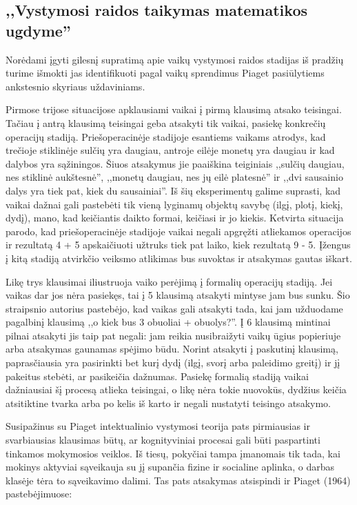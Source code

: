 \documentclass{article}
\begin{document}
\subsection{,,Vystymosi raidos taikymas matematikos ugdyme''}

Norėdami įgyti gilesnį supratimą apie vaikų vystymosi raidos stadijas iš pradžių turime išmokti jas identifikuoti pagal vaikų sprendimus Piaget pasiūlytiems ankstesnio skyriaus uždaviniams.

Pirmose trijose situacijose apklausiami vaikai į pirmą klausimą atsako teisingai. Tačiau į antrą klausimą teisingai geba atsakyti tik vaikai, pasiekę konkrečių operacijų stadiją. Priešoperacinėje stadijoje esantiems vaikams atrodys, kad trečioje stiklinėje sulčių yra daugiau, antroje eilėje monetų yra daugiau ir kad dalybos yra sąžiningos. Šiuos atsakymus jie paaiškina teiginiais ,,sulčių daugiau, nes stiklinė aukštesnė'', ,,monetų daugiau, nes jų eilė platesnė'' ir ,,dvi sausainio dalys yra tiek pat, kiek du sausainiai''. Iš šių eksperimentų galime suprasti, kad vaikai dažnai gali pastebėti tik vieną lyginamų objektų savybę (ilgį, plotį, kiekį, dydį), mano, kad keičiantis daikto formai, keičiasi ir jo kiekis. Ketvirta situacija parodo, kad priešoperacinėje stadijoje vaikai negali apgręžti atliekamos operacijos ir rezultatą 4 + 5 apskaičiuoti užtruks tiek pat laiko, kiek rezultatą 9 - 5. Įžengus į kitą stadiją atvirkčio veiksmo atlikimas bus suvoktas ir atsakymas gautas iškart.

Likę trys klausimai iliustruoja vaiko perėjimą į formalių operacijų stadiją. Jei vaikas dar jos nėra pasiekęs, tai į 5 klausimą atsakyti mintyse jam bus sunku. Šio straipsnio autorius pastebėjo, kad vaikas gali atsakyti tada, kai jam užduodame pagalbinį klausimą ,,o kiek bus 3 obuoliai + obuolys?''. Į 6 klausimą mintinai pilnai atsakyti jis taip pat negali: jam reikia nusibraižyti vaikų ūgius popieriuje arba atsakymas gaunamas spėjimo būdu. Norint atsakyti į paskutinį klausimą, paprasčiausia yra pasirinkti bet kurį dydį (ilgį, svorį arba paleidimo greitį) ir jį pakeitus stebėti, ar pasikeičia dažnumas. Pasiekę formalią stadiją vaikai dažniausiai šį procesą atlieka teisingai, o likę nėra tokie nuovokūs, dydžius keičia atsitiktine tvarka arba po kelis iš karto ir negali nustatyti teisingo atsakymo. \newline

Susipažinus su Piaget intektualinio vystymosi teorija pats pirmiausias ir svarbiausias klausimas būtų, ar kognityviniai procesai gali būti paspartinti tinkamos mokymosios veiklos. Iš tiesų, pokyčiai tampa įmanomais tik tada, kai mokinys aktyviai sąveikauja su jį supančia fizine ir socialine aplinka, o darbas klasėje tėra to sąveikavimo dalimi. Tas pats atsakymas atsispindi ir Piaget (1964) pastebėjimuose: 
\end{document}
